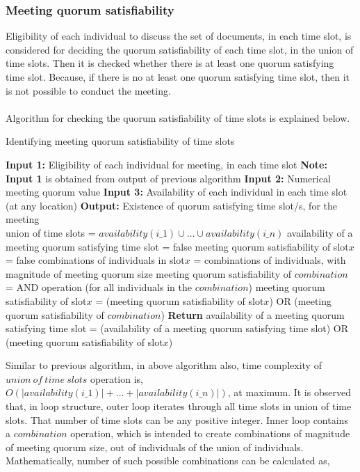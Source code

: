 \documentclass{article}
\begin{document}
\subsubsection{Meeting quorum satisfiability}
Eligibility of each individual to discuss the set of documents, in each time slot, is considered for deciding the quorum satisfiability of each time slot, in the union of time slots. Then it is checked whether there is at least one quorum satisfying time slot. Because, if there is no at least one quorum satisfying time slot, then it is not possible to conduct the meeting.\\ \\
Algorithm for checking the quorum satisfiability of time slots is explained below.
\begin{algorithm}[H]
    \caption{Identifying meeting quorum satisfiability of time slots}
    \begin{algorithmic}
        \State \textbf{Input 1:} Eligibility of each individual for meeting, in each time slot
        \State \textbf{Note:} \textbf{Input 1} is obtained from output of previous algorithm
        \State \textbf{Input 2:} Numerical meeting quorum value 
        \State \textbf{Input 3:} Availability of each individual in each time slot (at any location)
        \State \textbf{Output:} Existence of quorum satisfying time slot/s, for the meeting \\
        \State union of time slots = \(availability(i\_1) \cup \dots \cup availability(i\_n)\)
        \State availability of a meeting quorum satisfying time slot = false
            \State meeting quorum satisfiability of slot\(x\) = false
            \State combinations of individuals in slot\(x\) = combinations of individuals, with magnitude of meeting quorum size 
                \State meeting quorum satisfiability of \(combination\) = AND operation (for all individuals in the \(combination\))
                \State meeting quorum satisfiability of slot\(x\) = (meeting quorum satisfiability of slot\(x\)) OR (meeting quorum satisfiability of \(combination\))
            \EndFor
            \State \textbf{Return} availability of a meeting quorum satisfying time slot = (availability of a meeting quorum satisfying time slot) OR (meeting quorum satisfiability of slot\(x\))
        \EndFor
    \end{algorithmic}
\end{algorithm}
Similar to previous algorithm, in above algorithm also, time complexity of $union\ of\ time\ slots$ operation is, $O(|availability(i\_1)| + \dots + |availability(i\_n)|)$, at maximum. It is observed that, in loop structure, outer loop iterates through all time slots in union of time slots. That number of time slots can be any positive integer. Inner loop contains a $combination$ operation, which is intended to create combinations of magnitude of meeting quorum size, out of individuals of the union of individuals. Mathematically, number of such possible combinations can be calculated as,
\end{document}

